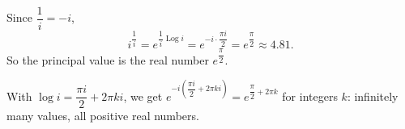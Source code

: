 Since $\dfrac{1}{i}=-i$,
\[i^{\dfrac{1}{i}}=e^{\dfrac{1}{i}\operatorname{Log}i}=e^{-i\cdot\dfrac{\pi i}{2}}=e^{\dfrac{\pi}{2}}\approx4.81 .\]
So the principal value is the real number $\boxed{e^{\dfrac{\pi}{2}}}$.

With $\log i=\dfrac{\pi i}{2}+2\pi ki$, we get $e^{-i\left(\dfrac{\pi i}{2}+2\pi ki\right)}=e^{\dfrac{\pi}{2}+2\pi k}$ for integers $k$: infinitely many values, all positive real numbers.
